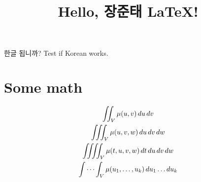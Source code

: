\documentclass[12pt]{article}
\begin{document}
\title{Hello, 장준태 \LaTeX!}
\maketitle

한글 됩니까? Test if Korean works.

\section{Some math}
\begin{gather*}
    \iint_V \mu(u,v) \,du\,dv
\\
    \iiint_V \mu(u,v,w) \,du\,dv\,dw
\\
    \iiiint_V \mu(t,u,v,w) \,dt\,du\,dv\,dw
\\
    \idotsint_V \mu(u_1,\dots,u_k) \,du_1 \dots du_k
\end{gather*}
\end{document}
